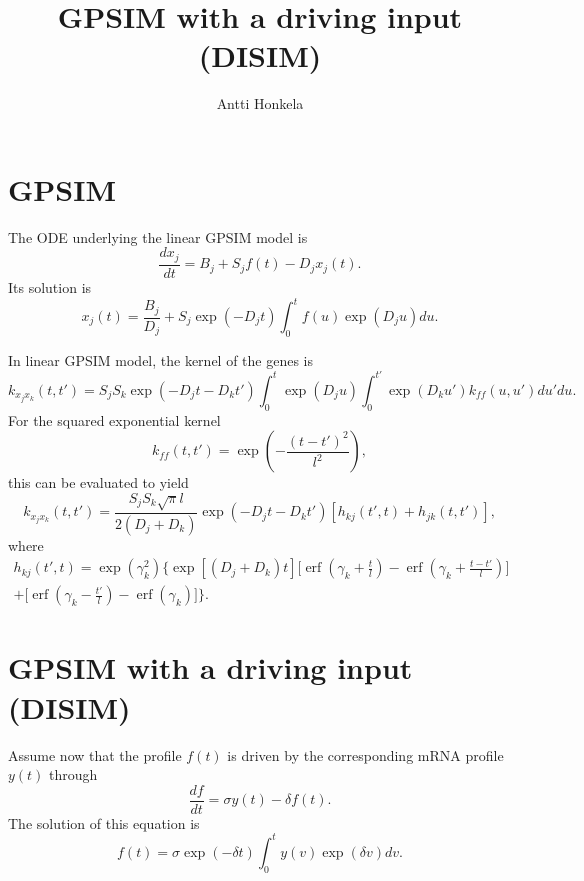 \documentclass[a4paper]{article}
\title{GPSIM with a driving input (DISIM)}
\author{Antti Honkela}
\newcommand{\erf}{\operatorname{erf}}
\begin{document}
\maketitle

\section{GPSIM}

The ODE underlying the linear GPSIM model is
\begin{equation}
  \label{eq:gpsim_ode}
  \frac{dx_j}{dt} = B_j + S_j f(t) - D_j x_j(t).
\end{equation}
Its solution is
\begin{equation}
  \label{eq:gpsim_ode_sol}
  x_j(t) = \frac{B_j}{D_j} + S_j \exp(-D_j t) \int_0^t f(u) \exp(D_j
  u) du.
\end{equation}

In linear GPSIM model, the kernel of the genes is
\begin{equation}
  \label{eq:gpsim_genekernel0}
  k_{x_j x_k}(t, t') = S_j S_k \exp(-D_j t - D_k t') \int_0^t \exp(D_j
  u)
  \int_0^{t'} \exp(D_k u') k_{ff}(u, u') du' du.
\end{equation}
For the squared exponential kernel
\begin{equation}
  \label{eq:sqexp_kernel}
  k_{ff}(t, t') = \exp\left( -\frac{(t-t')^2}{l^2} \right),
\end{equation}
this can be evaluated to yield
\begin{equation}
  \label{eq:gpsim_genekernel}
  k_{x_j x_k}(t, t') = \frac{S_j S_k \sqrt{\pi}l}{2(D_j + D_k)}
  \exp(-D_j t -D_k t') [ h_{kj}(t', t) +
  h_{jk}(t, t')],
\end{equation}
where
\begin{multline}
  \label{eq:gpsim_h}
  h_{kj}(t', t) = \exp(\gamma_k^2)
  \bigg\{ \exp[(D_j + D_k) t ] \bigg[
       \erf\left(\gamma_k + \frac{t}{l} \right) - 
       \erf\left(\gamma_k + \frac{t-t'}{l} \right) \bigg] \\
  + \bigg[
       \erf\left(\gamma_k - \frac{t'}{l} \right) -
       \erf\left(\gamma_k \right) \bigg] \bigg\}.
\end{multline}

\section{GPSIM with a driving input (DISIM)}

Assume now that the profile $f(t)$ is driven by the corresponding mRNA
profile $y(t)$ through
\begin{equation}
  \label{eq:gpsim_f_ode}
  \frac{df}{dt} = \sigma y(t) - \delta f(t).
\end{equation}
The solution of this equation is
\begin{equation}
  \label{eq:gpsim_f_ode_sol}
  f(t) = \sigma \exp(-\delta t) \int_0^t y(v) \exp(\delta v) dv.
\end{equation}
\end{document}
